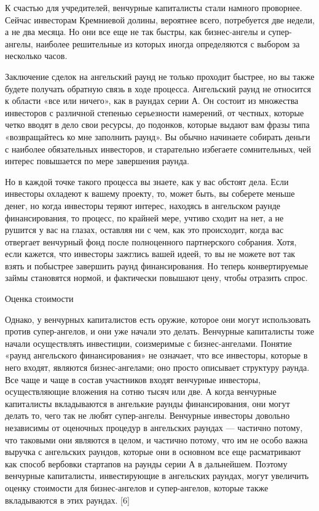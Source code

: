 \documentclass[ebook,12pt,oneside,openany]{memoir}
\begin{document}
К счастью для учредителей, венчурные капиталисты стали намного
проворнее. Сейчас инвесторам Кремниевой долины, вероятнее всего,
потребуется две недели, а не два месяца. Но они все еще не так быстры,
как бизнес-ангелы и супер-ангелы, наиболее решительные из которых
иногда определяются с выбором за несколько часов.

Заключение сделок на ангельский раунд не только проходит быстрее, но
вы также будете получать обратную связь в ходе процесса. Ангельский
раунд не относится к области «все или ничего», как в раундах серии А.
Он состоит из множества инвесторов с различной степенью серьезности
намерений, от честных, которые четко вводят в дело свои ресурсы, до
подонков, которые выдают вам фразы типа «возвращайтесь ко мне
заполнить раунд». Вы обычно начинаете собирать деньги с наиболее
обязательных инвесторов, и старательно избегаете сомнительных, чей
интерес повышается по мере завершения раунда.

Но в каждой точке такого процесса вы знаете, как у вас обстоят дела.
Если инвесторы охладеют к вашему проекту, то, может быть, вы соберете
меньше денег, но когда инвесторы теряют интерес, находясь в ангельском
раунде финансирования, то процесс, по крайней мере, учтиво сходит на
нет, а не рушится у вас на глазах, оставляя ни с чем, как это
происходит, когда вас отвергает венчурный фонд после полноценного
партнерского собрания. Хотя, если кажется, что инвесторы зажглись
вашей идеей, то вы не можете вот так взять и побыстрее завершить раунд
финансирования. Но теперь конвертируемые займы становятся нормой, и
фактически повышают цену, чтобы отразить спрос.

Оценка стоимости

Однако, у венчурных капиталистов есть оружие, которое они могут
использовать против супер-ангелов, и они уже начали это делать.
Венчурные капиталисты тоже начали осуществлять инвестиции, соизмеримые
с бизнес-ангелами. Понятие «раунд ангельского финансирования» не
означает, что все инвесторы, которые в него входят, являются
бизнес-ангелами; оно просто описывает структуру раунда. Все чаще и
чаще в состав участников входят венчурные инвесторы, осуществляющие
вложения на сотню тысяч или две. А когда венчурные капиталисты
вкладываются в ангелькие раунды финансирования, они могут делать то,
чего так не любят супер-ангелы. Венчурные инвесторы довольно
независимы от оценочных процедур в ангельских раундах — частично
потому, что таковыми они являются в целом, и частично потому, что им
не особо важна выручка с ангельских раундов, которые они в основном
все еще расматривают как способ вербовки стартапов на раунды серии А в
дальнейшем. Поэтому венчурные капиталисты, инвестирующие в ангельских
раундах, могут увеличить оценку стоимости для бизнес-ангелов и
супер-ангелов, которые также вкладываются в этих раундах. [6]
\end{document}
